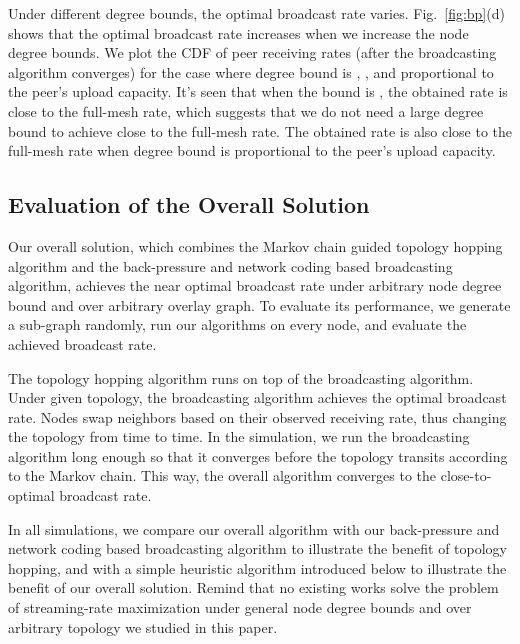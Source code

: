 \documentclass[10pt,conference]{IEEEtran}
\begin{document}
Under different degree bounds, the optimal broadcast rate varies. Fig.~\ref{fig:bp}(d) shows that the optimal broadcast rate increases when we increase the node degree bounds. We plot the CDF of peer receiving rates (after the broadcasting algorithm converges) for the case where degree bound is , , and proportional to the peer's upload capacity. It's seen that when the bound is , the obtained rate is close to the full-mesh rate, which suggests that we do not need a large degree bound to achieve close to the full-mesh rate. The obtained rate is also close to the full-mesh rate when degree bound is proportional to the peer's upload capacity.

\subsection{Evaluation of the Overall Solution}

Our overall solution, which combines the Markov chain guided topology hopping algorithm and
the back-pressure and network coding based broadcasting algorithm, achieves the near optimal broadcast rate
under arbitrary node degree bound and over arbitrary overlay graph.
To evaluate its performance, we generate a sub-graph randomly, run our algorithms on
every node, and evaluate the achieved broadcast rate.


The topology hopping algorithm runs on top of the broadcasting algorithm. Under given topology, the broadcasting algorithm achieves the optimal broadcast rate. Nodes swap neighbors based on their observed receiving rate, thus changing the topology from time to time. In the simulation, we run the broadcasting algorithm long enough so that it converges before the topology transits according to the Markov chain. This way, the overall algorithm converges to the close-to-optimal broadcast rate.

In all simulations, we compare our overall algorithm with our back-pressure and network coding based broadcasting algorithm to illustrate the benefit of topology hopping, and with a simple heuristic algorithm introduced below to illustrate the benefit of our overall solution. Remind that no existing works solve the problem of streaming-rate maximization under general node degree bounds and over arbitrary topology we studied in this paper.
\end{document}
